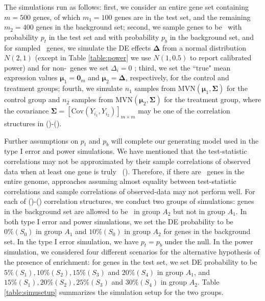 	The simulations run as follows: first, we consider an entire gene set containing $m=500$ genes,
	of which $m_1 = 100$ genes are in the test set, and the
	remaining $m_2=400$ genes in the background set; second, we sample genes to be \DED~with 
	probability $p_t$ in the test set and with probability $p_b$ in the background set, and for 
	sampled \DED~genes, we simulate the DE effects $\bm \Delta$ from  a normal distribution $N(2, 
	1)$ (except in Table \ref{table:power} we use $N(1, 0.5)$ to report calibrated power) and for 
	non-\DED~genes we set $\Delta_i= 0$ ; third, we set the ``true" mean expression values $\bm 
	\mu_1 
	= \bm 0_m$ and $\bm \mu_2 = \bm \Delta$, respectively, for the control and treatment groups; 
	fourth, we simulate $n_1$ samples from $\text{MVN}(\bm \mu_1, \bm \Sigma)$ for the control 
	group and $n_2$ samples from $\text{MVN}(\bm \mu_2, \bm \Sigma)$ for
	the treatment group, where the covariance $\bm \Sigma = \left[\text{Cov}(Y_{i_1},
	Y_{i_2})\right]_{m\times m}$ may be one of the correlation structures in (\aaCase)-(\fCase).
	
	Further assumptions on $p_t$ and $p_b$ will complete our generating model used in the type I 
	error and power simulations. %
	We have mentioned that the test-statistic correlations may not be approximated by their sample 
	correlations of observed data when at least one gene is truly \DED~(\thepapertobefinished). 
	Therefore, if there are \DED~genes in the entire genome, 
	approaches assuming	almost equality between test-statistic correlations and sample correlations 
	of observed-data may not perform well. For each of (\aaCase)-(\fCase) correlation 
	structures, we conduct two groups of simulations: genes in the background set are allowed to be 
	\DED~in group $A_2$ but not in group $A_1$.  In both type I error and power 
	simulations, we set the DE probability to be $0\%(S_0)$ in group $A_1$ and $10\%(S_0)$ in group 
	$A_2$ for genes in the background set. In the type I error simulation, we have $p_t = p_b$ 
	under the null. In the power simulation, we considered four different scenarios for the 
	alternative hypothesis of the presence of enrichment: for genes in the test set, we set DE
	probability to be $5\% (S_1), 10\%(S_2), 15\%(S_3)$ and $20\%(S_4)$ in group $A_1$, and 
	$15\%(S_1),	20\%(S_2), 25\%(S_3)$ and $30\%(S_4)$ in group $A_2$. Table \ref{table:simusetup} 
	summarizes the simulation setup for the two groups.
	

